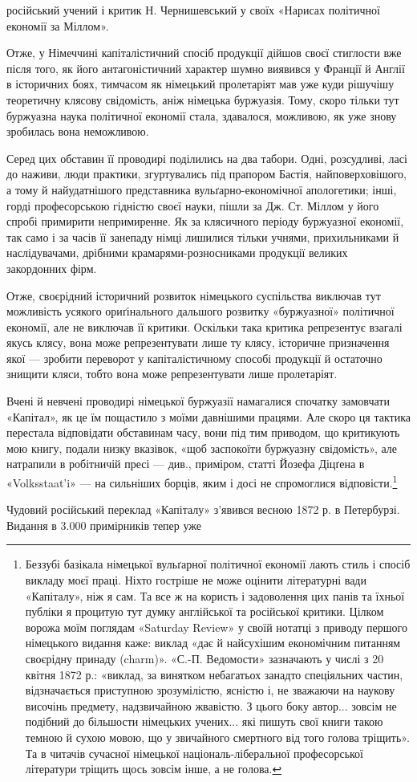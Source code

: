 російський учений і критик Н. Чернишевський у своїх «Нарисах
політичної економії за Міллом».

Отже, у Німеччині капіталістичний спосіб продукції дійшов
своєї стиглости вже після того, як його антагоністичний характер
шумно виявився у Франції й Англії в історичних боях, тимчасом
як німецький пролетаріят мав уже куди рішучішу теоретичну
клясову свідомість, аніж німецька буржуазія. Тому, скоро тільки
тут буржуазна наука політичної економії стала, здавалося, можливою,
як уже знову зробилась вона неможливою.

Серед цих обставин її проводирі поділились на два табори.
Одні, розсудливі, ласі до наживи, люди практики, згуртувались
під прапором Бастія, найповерховішого, а тому й найудатнішого
представника вульґарно-економічної апологетики; інші, горді
професорською гідністю своєї науки, пішли за Дж. Ст. Міллом у
його спробі примирити непримиренне. Як за клясичного періоду
буржуазної економії, так само і за часів її занепаду німці лишилися
тільки учнями, прихильниками й наслідувачами, дрібними
крамарями-розносниками продукції великих закордонних фірм.

Отже, своєрідний історичний розвиток німецького суспільства
виключав тут можливість усякого ориґінального дальшого розвитку
«буржуазної» політичної економії, але не виключав її
критики. Оскільки така критика репрезентує взагалі якусь клясу,
вона може репрезентувати лише ту клясу, історичне призначення
якої — зробити переворот у капіталістичному способі продукції
й остаточно знищити кляси, тобто вона може репрезентувати лише
пролетаріят.

Вчені й невчені проводирі німецької буржуазії намагалися
спочатку замовчати «Капітал», як це їм пощастило з моїми давнішими
працями. Але скоро ця тактика перестала відповідати
обставинам часу, вони під тим приводом, що критикують мою
книгу, подали низку вказівок, «щоб заспокоїти буржуазну свідомість»,
але натрапили в робітничій пресі — див., приміром,
статті Йозефа Діцґена в «Volksstaat’i» — на сильніших борців,
яким і досі не спромоглися відповісти.\footnote{
Беззубі базікала німецької вульґарної політичної економії лають
стиль і спосіб викладу моєї праці. Ніхто гостріше не може оцінити літературні
вади «Капіталу», ніж я сам. Та все ж на користь і задоволення
цих панів та їхньої публіки я процитую тут думку англійської та російської
критики. Цілком ворожа моїм поглядам «Saturday Review» у своїй
нотатці з приводу першого німецького видання каже: виклад «дає й
найсухішим економічним питанням своєрідну принаду (charm)». «С.-П.
Ведомости» зазначають у числі з 20 квітня 1872 р.: «виклад, за винятком
небагатьох занадто спеціяльних частин, відзначається приступною зрозумілістю,
ясністю і, не зважаючи на наукову височінь предмету, надзвичайною
жвавістю. З цього боку автор... зовсім не подібний до більшости
німецьких учених... які пишуть свої книги такою темною й сухою мовою,
що у звичайного смертного від того голова тріщить». Та в читачів сучасної
німецької національ-ліберальної професорської літератури тріщить
щось зовсім інше, а не голова.
}

Чудовий російський переклад «Капіталу» з’явився весною
1872 р. в Петербурзі. Видання в 3.000 примірників тепер уже